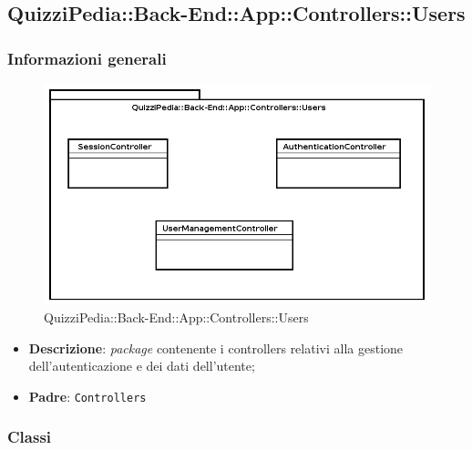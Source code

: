 \subsection{QuizziPedia::Back-End::App::Controllers::Users}
\subsubsection{Informazioni generali}
\label{QuizziPedia::Back-End::App::Controllers::Users}
\begin{figure}[ht]
	\centering
	\includegraphics[scale=0.45]{UML/Package/QuizziPedia_Back-End_App_Controllers_Users.png}
	\caption{QuizziPedia::Back-End::App::Controllers::Users}
\end{figure}
\FloatBarrier
\begin{itemize}
	\item 
	\textbf{Descrizione}:
	\textit{package} contenente i controllers relativi alla gestione dell'autenticazione e dei dati dell'utente;
	\item
	\textbf{Padre}:
	\texttt{Controllers}
\end{itemize}	
\subsubsection{Classi}
